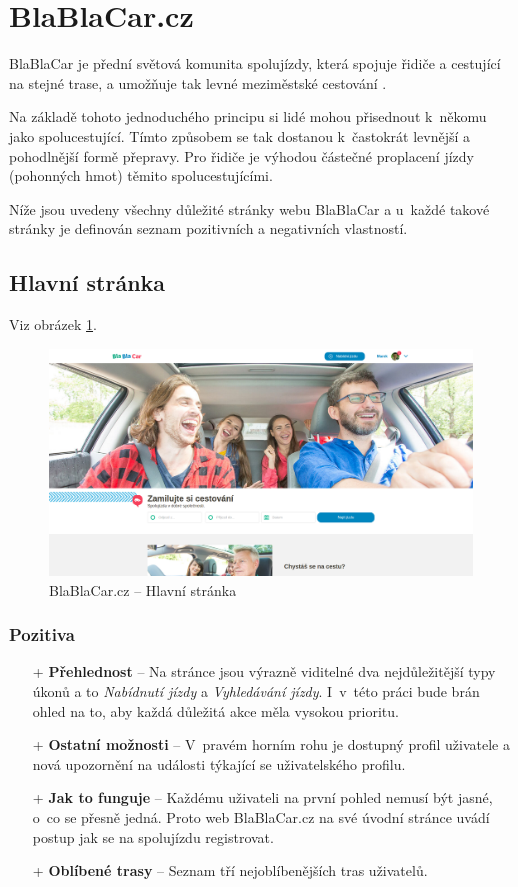 \section{BlaBlaCar.cz}
\label{analyza:blablacar}

BlaBlaCar je přední světová komunita spolujízdy, která spojuje řidiče a cestující na stejné trase, a umožňuje tak levné meziměstské cestování \cite{blablacar}.

Na základě tohoto jednoduchého principu si lidé mohou přisednout k~někomu jako spolucestující. Tímto způsobem se tak dostanou k~častokrát levnější a pohodlnější formě přepravy. Pro řidiče je výhodou částečné proplacení jízdy (pohonných hmot) těmito spolucestujícími.

Níže jsou uvedeny všechny důležité stránky webu BlaBlaCar a u~každé takové stránky je definován seznam pozitivních a negativních vlastností.

\subsection{Hlavní stránka}
Viz obrázek \ref{fig:blablacar:homepage}.
\begin{figure}[h]
    \centering
    \includegraphics[width=1.0\textwidth]{media/blablacar/homepage.png}
    \caption{BlaBlaCar.cz -- Hlavní stránka}
    \label{fig:blablacar:homepage}
\end{figure}
\subsubsection*{Pozitiva}
\begin{itemize}
    \item[+] \textbf{Přehlednost} -- Na stránce jsou výrazně viditelné dva nejdůležitější typy úkonů a to \textit{Nabídnutí jízdy} a \textit{Vyhledávání jízdy}. I~v~této práci bude brán ohled na to, aby každá důležitá akce měla vysokou prioritu.
    \item[+] \textbf{Ostatní možnosti} -- V~pravém horním rohu je dostupný profil uživatele a nová upozornění na události týkající se uživatelského profilu.
    \item[+] \textbf{Jak to funguje} -- Každému uživateli na první pohled nemusí být jasné, o~co se přesně jedná. Proto web BlaBlaCar.cz na své úvodní stránce uvádí postup jak se na spolujízdu registrovat.
    \item[+] \textbf{Oblíbené trasy} -- Seznam tří nejoblíbenějších tras uživatelů.
\end{itemize}
